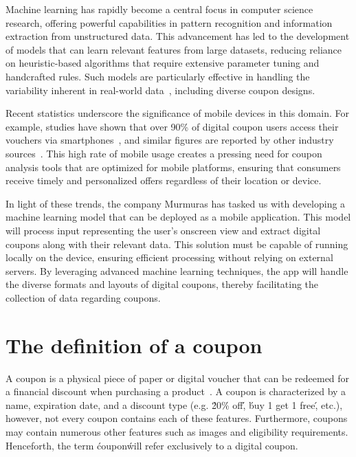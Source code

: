\documentclass[licencjacka,en]{docs/pracamgr}
\begin{document}
Machine learning has rapidly become a central focus in computer science research, offering powerful capabilities in pattern recognition and information extraction from unstructured data. This advancement has led to the development of models that can learn relevant features from large datasets, reducing reliance on heuristic-based algorithms that require extensive parameter tuning and handcrafted rules. Such models are particularly effective in handling the variability inherent in real-world data~\cite{ml_general}, including diverse coupon designs.

Recent statistics underscore the significance of mobile devices in this domain. For example, studies have shown that over 90\% of digital coupon users access their vouchers via smartphones~\cite{emarketer_coupon_stats}, and similar figures are reported by other industry sources~\cite{coupon_stats_2}. This high rate of mobile usage creates a pressing need for coupon analysis tools that are optimized for mobile platforms, ensuring that consumers receive timely and personalized offers regardless of their location or device.

In light of these trends, the company Murmuras has tasked us with developing a machine learning model that can be deployed as a mobile application. This model will process input representing the user's onscreen view and extract digital coupons along with their relevant data. This solution must be capable of running locally on the device, ensuring efficient processing without relying on external servers. By leveraging advanced machine learning techniques, the app will handle the diverse formats and layouts of digital coupons, thereby facilitating the collection of data regarding coupons.

\section{The definition of a coupon} 
A coupon is a physical piece of paper or digital voucher that can be redeemed for a financial discount when purchasing a product~\cite{coupon_definition}. A coupon is characterized by a name, expiration date, and a discount type (e.g. \'20\% off\', \'buy 1 get 1 free\', etc.), however, not every coupon contains each of these features. Furthermore, coupons may contain numerous other features such as images and eligibility requirements. Henceforth, the term \'coupon\' will refer exclusively to a digital coupon.
\end{document}
